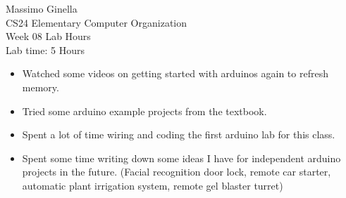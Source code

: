 \documentclass[12pt]{article}
\begin{document}
	\begin{center}
		Massimo Ginella \\
		CS24 Elementary Computer Organization \\
		Week 08 Lab Hours \\
		Lab time: 5 Hours \vspace{0.5cm} \\
	\end{center}
	
	\begin{itemize}
		\item Watched some videos on getting started with arduinos again to refresh memory.
		\item Tried some arduino example projects from the textbook.
		\item Spent a lot of time wiring and coding the first arduino lab for this class.
		\item Spent some time writing down some ideas I have for independent arduino projects in the future. (Facial recognition door lock, remote car starter, automatic plant irrigation system, remote gel blaster turret)
	\end{itemize}
	
	
	
\end{document}

